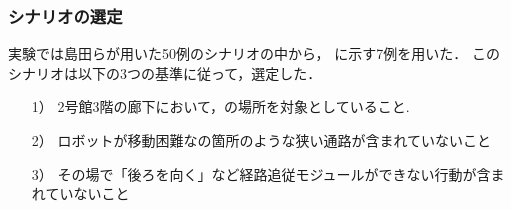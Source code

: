 \subsubsection{シナリオの選定}
実験では島田らが用いた50例のシナリオの中から，
に示す7例を用いた．
このシナリオは以下の3つの基準に従って，選定した．
\begin{enumerate}
    \item [1）] 2号館3階の廊下において，の場所を対象としていること.
    \item [2）] ロボットが移動困難なの箇所のような狭い通路が含まれていないこと
    \item [3）] その場で「後ろを向く」など経路追従モジュールができない行動が含まれていないこと
\end{enumerate}

